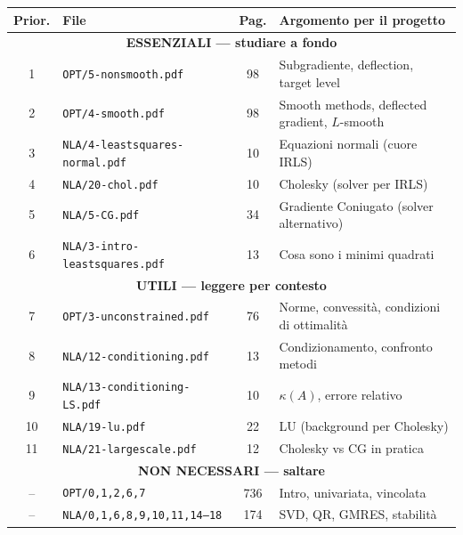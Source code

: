 \documentclass[a4paper,11pt]{article}
\theoremstyle{definition}
\begin{document}
\begin{center}
\renewcommand{\arraystretch}{1.25}
\begin{tabular}{|c|l|c|l|}
\hline
\textbf{Prior.} & \textbf{File} & \textbf{Pag.} & \textbf{Argomento per il progetto} \\
\hline\hline
\multicolumn{4}{|c|}{\cellcolor{red!10}\textbf{ESSENZIALI --- studiare a fondo}} \\
\hline
1 & \texttt{OPT/5-nonsmooth.pdf} & 98 & Subgradiente, deflection, target level \\
2 & \texttt{OPT/4-smooth.pdf} & 98 & Smooth methods, deflected gradient, $L$-smooth \\
3 & \texttt{NLA/4-leastsquares-normal.pdf} & 10 & Equazioni normali (cuore IRLS) \\
4 & \texttt{NLA/20-chol.pdf} & 10 & Cholesky (solver per IRLS) \\
5 & \texttt{NLA/5-CG.pdf} & 34 & Gradiente Coniugato (solver alternativo) \\
6 & \texttt{NLA/3-intro-leastsquares.pdf} & 13 & Cosa sono i minimi quadrati \\
\hline
\multicolumn{4}{|c|}{\cellcolor{orange!10}\textbf{UTILI --- leggere per contesto}} \\
\hline
7 & \texttt{OPT/3-unconstrained.pdf} & 76 & Norme, convessità, condizioni di ottimalità \\
8 & \texttt{NLA/12-conditioning.pdf} & 13 & Condizionamento, confronto metodi \\
9 & \texttt{NLA/13-conditioning-LS.pdf} & 10 & $\kappa(A)$, errore relativo \\
10 & \texttt{NLA/19-lu.pdf} & 22 & LU (background per Cholesky) \\
11 & \texttt{NLA/21-largescale.pdf} & 12 & Cholesky vs CG in pratica \\
\hline
\multicolumn{4}{|c|}{\cellcolor{green!10}\textbf{NON NECESSARI --- saltare}} \\
\hline
-- & \texttt{OPT/0,1,2,6,7} & 736 & Intro, univariata, vincolata \\
-- & \texttt{NLA/0,1,6,8,9,10,11,14--18} & 174 & SVD, QR, GMRES, stabilità \\
\hline
\end{tabular}
\end{center}
\end{document}
